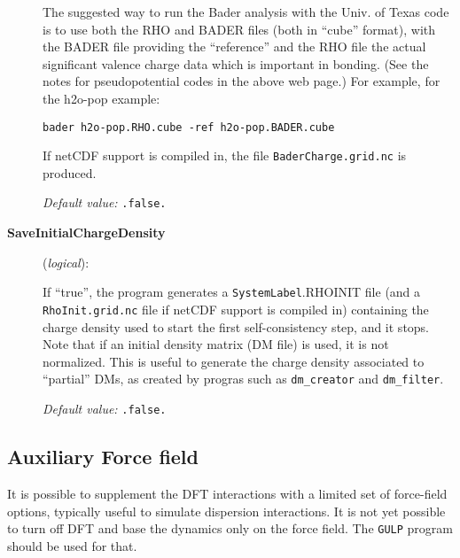 \documentclass[11pt]{article}
\begin{document}
\begin{description}
  The suggested way to run the Bader analysis with the Univ. of Texas
  code is to use both the RHO and BADER files (both in ``cube''
  format), with the BADER file providing the ``reference'' and the RHO
  file the actual significant valence charge data which is important
  in bonding. (See the notes for pseudopotential codes in the above
  web page.) For example, for the h2o-pop example:

  {\tt bader  h2o-pop.RHO.cube -ref h2o-pop.BADER.cube}


If netCDF support is compiled in, the file {\tt BaderCharge.grid.nc}
is produced.

{\it Default value:} {\tt .false.}



\item[{\bf SaveInitialChargeDensity}] ({\it logical}):

  If ``true'', the program generates a {\tt SystemLabel}.RHOINIT file
  (and a {\tt RhoInit.grid.nc} file if netCDF support is compiled in)
  containing the charge density used to start the first
  self-consistency step, and it stops. Note that if an initial density
  matrix (DM file) is used, it is not normalized. This is useful to
  generate the charge density associated to ``partial'' DMs, as
  created by progras such as {\tt dm\_creator} and {\tt dm\_filter}.

{\it Default value:} {\tt .false.}


\end{description}

\vspace{5pt}
\subsection{Auxiliary Force field}

It is possible to supplement the DFT interactions with a limited
set of force-field options, typically useful to simulate dispersion
interactions. It is not yet possible to turn off DFT and base the
dynamics only on the force field. The {\tt GULP} program should be
used for that.
\end{document}
